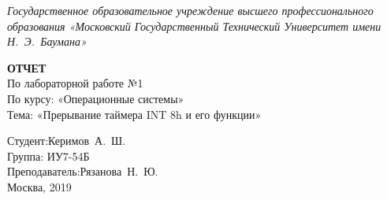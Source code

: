 \begin{titlepage}
	\centering

	{\footnotesize \itshape Государственное образовательное учреждение высшего профессионального образования «Московский Государственный Технический Университет имени Н.~Э.~Баумана»\\}

	\vspace{60mm}

	\textbf{ОТЧЕТ}\\
	По лабораторной работе №1\\
	По курсу: «Операционные системы»\\
	Тема: «Прерывание таймера INT 8h и его функции»\\

	\vspace{60mm}

	\hspace{70mm} Студент:\hfill Керимов~А.~Ш.\\
	\hspace{70mm} Группа: \hfill ИУ7-54Б\\
	\hspace{70mm} Преподаватель:\hfill Рязанова~Н.~Ю.\\

	\vfill
	Москва, 2019
\end{titlepage}
